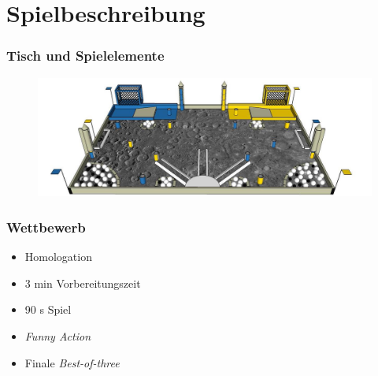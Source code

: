 \section{Spielbeschreibung}

\begin{frame}
	\frametitle{Tisch und Spielelemente}
	\begin{figure}
		\centering
		\includegraphics[width = 13cm]{../images/presentation/spielfeldElemente.jpg}
	\end{figure}
	
\end{frame}

\begin{frame}
	
	
	\frametitle{Wettbewerb}
	
	\begin{itemize}
		\item Homologation
	\end{itemize}
	\begin{itemize}
		\item 3 min Vorbereitungszeit
		\item 90 s Spiel
		\item \textit{Funny Action}
	\end{itemize}
	\begin{itemize}
		\item Finale \textit{Best-of-three}
	\end{itemize}
\end{frame}